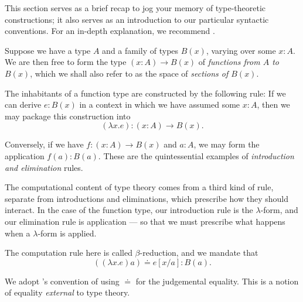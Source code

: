 This section serves as a brief recap to jog your memory of
type-theoretic constructions; it also serves as an introduction to our
particular syntactic conventions. For an in-depth explanation, we
recommend \cite{Rijke:2022}.

\begin{node}
%
Suppose we have a type \(A\) and a family of types \(B(x)\), varying
over some \(x : A\). We are then free to form the type \((x : A) \to
B(x)\) of \emph{functions from \(A\) to \(B(x)\)}, which we shall also
refer to as the space of \emph{sections of \(B(x)\)}.
%
\end{node}

\begin{node}
%
The inhabitants of a function type are constructed by the following
rule: If we can derive \(e : B(x)\) in a context in which we have
assumed some \(x : A\), then we may package this construction into \[
  (\lambda x. e) : (x : A) \to B(x).
\]

Conversely, if we have \(f : (x : A) \to B(x)\) and \(a : A\), we may
form the application \(f(a) : B(a)\). These are the quintessential
examples of \emph{introduction and elimination} rules.
%
\end{node}

\begin{node}
%
The computational content of type theory comes from a third kind of
rule, separate from introductions and eliminations, which prescribe how
they should interact. In the case of the function type, our introduction
rule is the \(\lambda\)-form, and our elimination rule is application
--- so that we must prescribe what happens when a \(\lambda\)-form is
applied.

The computation rule here is called \(\beta\)-reduction, and we mandate
that
\[
  ((\lambda x. e) a) \doteq e[x/a] : B(a).
\]
%
\end{node}

\begin{remark}
We adopt \cite{Rijke:2022}'s convention of using \(\doteq\) for the
judgemental equality. This is a notion of equality \emph{external} to
type theory.
\end{remark}
